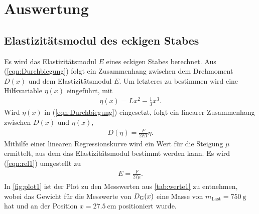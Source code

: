 \section{Auswertung}
\label{sec:Auswertung}

\subsection{Elastizitätsmodul des eckigen Stabes}
\label{subsec:elastiEckig}
Es wird das Elastizitätsmodul $E$ eines eckigen Stabes berechnet.
Aus (\ref{eqn:Durchbiegung}) folgt ein Zusammenhang zwischen dem Drehmoment $D(x)$ und dem Elastizitätsmodul $E$. Um letzteres zu bestimmen
wird eine Hilfsvariable $\eta(x)$ eingeführt, mit 
\begin{align*}
  \eta(x) = Lx^2- \frac 13 x^3.
\end{align*}
Wird $\eta(x)$ in (\ref{eqn:Durchbiegung}) eingesetzt, folgt ein linearer Zusammenhang zwischen $D(x)$ und $\eta(x)$,
\begin{align}
  D(\eta) = \frac{F}{2EI}\eta.
  \label{eqn:rel1}
\end{align}
Mithilfe einer linearen Regressionskurve wird ein Wert für die Steigung $\mu$ ermittelt, aus dem das Elastizitätsmodul bestimmt
werden kann. Es wird (\ref{eqn:rel1}) umgestellt zu
\begin{align}
  E = \frac{F}{2I\mu}.
  \label{eqn:linRegq}
\end{align}
In \autoref{fig:plot1} ist der Plot zu den Messwerten 
aus \autoref{tab:werte1} zu entnehmen, wobei das Gewicht für die Messwerte von $D_{\text G}(x)$ eine Masse von 
$m_{\text{Last}}=\SI{750}{\gram}$ hat und an der Position $x = \SI{27.5}{\centi\meter}$ positioniert wurde.  


